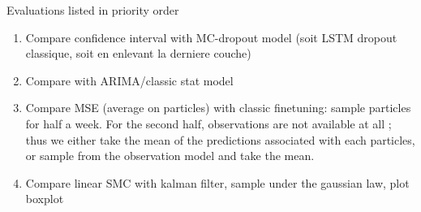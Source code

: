 \documentclass{article}
\begin{document}
Evaluations listed in priority order
\begin{enumerate}
	\item Compare confidence interval with MC-dropout model (soit LSTM dropout classique, soit en enlevant la derniere couche)
	\item Compare with ARIMA/classic stat model
	\item Compare MSE (average on particles) with classic finetuning: sample particles for half a week. For the second half, observations are not available at all ; thus we either take the mean of the predictions associated with each particles, or sample from the observation model and take the mean.
	\item Compare linear SMC with kalman filter, sample under the gaussian law, plot boxplot
\end{enumerate}








\end{document}
